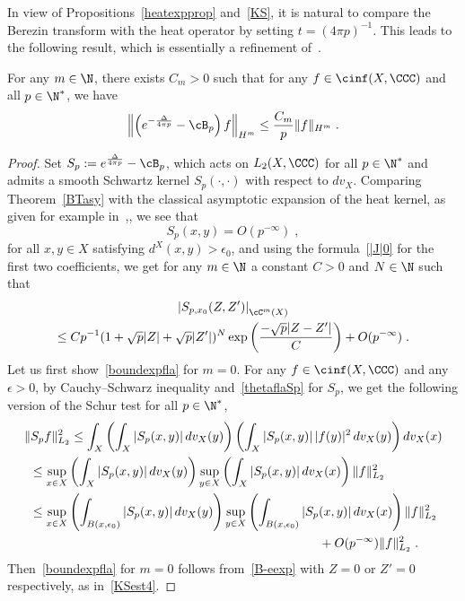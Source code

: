 In view of Propositions~\ref{heatexpprop} and~\ref{KS}, it is natural to compare the Berezin transform with the heat operator by setting $t=(4\pi p)^{-1}$. This leads to the following result, which is essentially a refinement of~\cite[Theorem~0.1]{LM07}.

\begin{prop}\label{boundexp}
For any $m\in\N$, there exists $C_m>0$ such that for any $f\in\cinf(X,\CCC)$ and all $p\in\N^*$, we have
\begin{equation}\label{boundexpfla}
\left\|\left(e^{-\frac{\Delta}{4\pi p}}-\cB_p\right)f\right\|_{H^m}\leq
\frac{C_m}{p}\|f\|_{H^m}\;.
\end{equation}
\end{prop}
\begin{proof}
Set $S_p:=e^{\frac{\Delta}{4\pi p}}-\cB_p$, which acts on $L_2(X,\CCC)$ for all $p\in\N^*$ and admits a smooth Schwartz kernel $S_p(\cdot,\cdot)$ with respect to $dv_X$. Comparing Theorem~\ref{BTasy} with the classical asymptotic expansion of the heat kernel, as given for example in~\cite[Theorem~2.29]{BGV04},\cite{Kannai}, we see that
\begin{equation}\label{thetaflaSp}
S_p(x,y)=O(p^{-\infty})\;,
\end{equation}
for all $x,y\in X$ satisfying $d^X(x,y)>\epsilon_0$, and using the formula~\eqref{|J|0} for the first two coefficients, we get for any $m\in\N$ a constant $C>0$ and $N\in\N$ such that
\begin{multline}\label{B-eexp}
\left|S_{p,x_0}(Z,Z')\right|_{\cC^m(X)}\\
\leq Cp^{-1} (1+\sqrt{p}|Z|+\sqrt{p}|Z'|)^N
\exp\left(\frac{-\sqrt{p}|Z-Z'|}{C}\right)
+O(p^{-\infty})\;.
\end{multline}
Let us first show~\eqref{boundexpfla} for $m=0$. For any $f\in\cinf(X,\CCC)$ and any $\epsilon>0$, by Cauchy--Schwarz inequality and~\eqref{thetaflaSp} for $S_p$, we get the following version of the Schur test for all $p\in\N^*$,
\begin{multline}\label{Schurtest}
\|S_p f\|_{L_2}^2\leq\int_X\left(\int_X |S_p(x,y)|\,dv_X(y)\right)
\left(\int_X |S_p(x,y)|\,|f(y)|^2\,dv_X(y)\right)dv_X(x)\\
\begin{aligned}
&\leq\sup_{x\in X}\left(\int_X|S_p(x,y)|\,dv_X(y)\right)
\sup_{y\in X}\left(\int_X|S_p(x,y)|\,dv_X(x)\right)\|f\|_{L_2}^2\\
&\leq\sup_{x\in X}\left(\int_{B(x,\epsilon_0)}|S_p(x,y)|\,dv_X(y)\right)
\sup_{y\in X}\left(\int_{B(x,\epsilon_0)}|S_p(x,y)|\,dv_X(x)\right)\|f\|_{L_2}^2\\
&\mkern415mu +O(p^{-\infty})\|f\|_{L_2}^2\;.
\end{aligned}
\end{multline}
Then~\eqref{boundexpfla} for $m=0$ follows from~\eqref{B-eexp} with $Z=0$ or $Z'=0$ respectively, as in~\eqref{KSest4}.


\end{proof}
